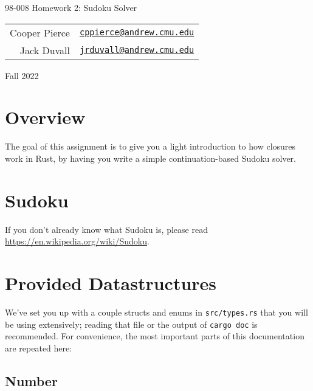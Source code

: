 \documentclass{article}
\newcommand{\longsemester}{Fall 2022}
\newcommand{\deptcode}{98}
\newcommand{\coursecode}{008}
\newcommand{\fullcoursecode}{\deptcode-\coursecode}
\begin{document}
\thispagestyle{empty}
\begin{center}
    \begin{minipage}{.85\textwidth}
        \centering
        {\huge {\fullcoursecode} Homework 2: Sudoku Solver}

        \vspace{1em}

        \begin{tabular}{@{}rl@{}}
            Cooper Pierce & \href{mailto:cppierce@andrew.cmu.edu}{\texttt{cppierce@andrew.cmu.edu}} \\
            Jack Duvall & \href{mailto:jrduvall@andrew.cmu.edu}{\texttt{jrduvall@andrew.cmu.edu}} \\
        \end{tabular}

        \vspace{1em}

        \longsemester
    \end{minipage}
\end{center}

\section*{Overview}

The goal of this assignment is to give you a light introduction to how closures work in Rust, by having you write a simple continuation-based Sudoku solver. 

\section*{Sudoku}

If you don't already know what Sudoku is, please read \url{https://en.wikipedia.org/wiki/Sudoku}.

\section*{Provided Datastructures}

We've set you up with a couple structs and enums in \texttt{src/types.rs} that you will be using extensively; reading that file or the output of \texttt{cargo doc} is recommended. For convenience, the most important parts of this documentation are repeated here:

\subsection*{Number}
\end{document}
